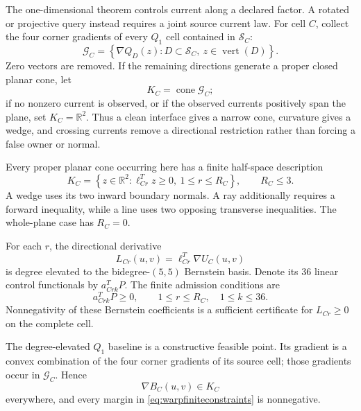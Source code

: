 \documentclass[journal]{IEEEtran}
\newcommand{\R}{\mathbb{R}}
\begin{document}
The one-dimensional theorem controls current along a declared factor.  A
rotated or projective query instead requires a joint source current law.  For
cell \(C\), collect the four corner gradients of every \(Q_1\) cell contained
in \(\mathcal S_C\):
\begin{equation}
 \mathcal G_C=
 \left\{\nabla Q_D(z):D\subset\mathcal S_C,
              \ z\in\operatorname{vert}(D)\right\}.
 \label{eq:warpgenerators}
\end{equation}
Zero vectors are removed.  If the remaining directions generate a proper
closed planar cone, let
\begin{equation}
 K_C=\operatorname{cone}\mathcal G_C;
 \label{eq:warpcone}
\end{equation}
if no nonzero current is observed, or if the observed currents positively
span the plane, set \(K_C=\R^2\).  Thus a clean interface gives a narrow
cone, curvature gives a wedge, and crossing currents remove a directional
restriction rather than forcing a false owner or normal.

Every proper planar cone occurring here has a finite half-space description
\begin{equation}
 K_C=\left\{z\in\R^2:\ell_{Cr}^Tz\geq0,
                       \ 1\leq r\leq R_C\right\},
 \qquad R_C\leq3.
 \label{eq:warpconedual}
\end{equation}
A wedge uses its two inward boundary normals.  A ray additionally requires a
forward inequality, while a line uses two opposing transverse inequalities.
The whole-plane case has \(R_C=0\).

For each \(r\), the directional derivative
\begin{equation}
 L_{Cr}(u,v)=\ell_{Cr}^T\nabla U_C(u,v)
 \label{eq:warpdirectional}
\end{equation}
is degree elevated to the bidegree-\((5,5)\) Bernstein basis.  Denote its 36
linear control functionals by \(a_{Crk}^TP\).  The finite admission
conditions are
\begin{equation}
 a_{Crk}^TP\geq0,\qquad
 1\leq r\leq R_C,\quad 1\leq k\leq36.
 \label{eq:warpfiniteconstraints}
\end{equation}
Nonnegativity of these Bernstein coefficients is a sufficient certificate
for \(L_{Cr}\geq0\) on the complete cell.

The degree-elevated \(Q_1\) baseline is a constructive feasible point.  Its
gradient is a convex combination of the four corner gradients of its source
cell; those gradients occur in \(\mathcal G_C\).  Hence
\begin{equation}
 \nabla B_C(u,v)\in K_C
 \label{eq:warpbaselinefeasible}
\end{equation}
everywhere, and every margin in \eqref{eq:warpfiniteconstraints} is
nonnegative.
\end{document}

